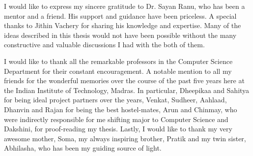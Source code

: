 I would like to express my sincere gratitude to Dr. Sayan Ranu, who has been a mentor and a friend. His support and guidance have been priceless. A special thanks to Jithin Vachery for sharing his knowledge and expertise. Many of the ideas described in this thesis would not have been possible without the many constructive and valuable discussions I had with the both of them.

I would like to thank all the remarkable professors in the Computer Science Department for their constant encouragement. A notable mention to all my friends for the wonderful memories over the course of the past five years here at the Indian Institute of Technology, Madras. In particular, Dheepikaa and Sahitya for being ideal project partners over the years, Venkat, Sudheer, Aahlaad, Dhanvin and Rajan for being the best hostel-mates, Arun and Chinmay, who were indirectly responsible for me shifting major to Computer Science and Dakshini, for proof-reading my thesis. Lastly, I would like to thank my very awesome mother, Soma, my always inspiring brother, Pratik and my twin sister, Abhilasha, who has been my guiding source of light. 